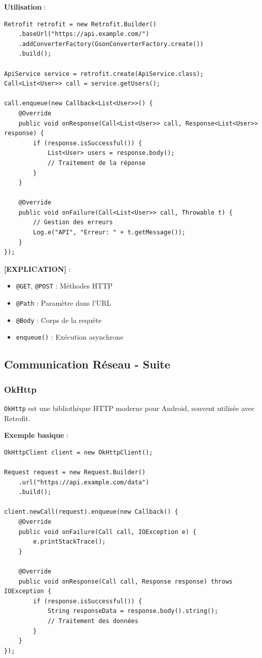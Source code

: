 \documentclass[11pt,a4paper]{article}
\begin{document}
\textbf{Utilisation} :
\begin{lstlisting}
Retrofit retrofit = new Retrofit.Builder()
    .baseUrl("https://api.example.com/")
    .addConverterFactory(GsonConverterFactory.create())
    .build();

ApiService service = retrofit.create(ApiService.class);
Call<List<User>> call = service.getUsers();

call.enqueue(new Callback<List<User>>() {
    @Override
    public void onResponse(Call<List<User>> call, Response<List<User>> response) {
        if (response.isSuccessful()) {
            List<User> users = response.body();
            // Traitement de la réponse
        }
    }
    
    @Override
    public void onFailure(Call<List<User>> call, Throwable t) {
        // Gestion des erreurs
        Log.e("API", "Erreur: " + t.getMessage());
    }
});
\end{lstlisting}

\textbf{[EXPLICATION]} :
\begin{itemize}
    \item \texttt{@GET}, \texttt{@POST} : Méthodes HTTP
    \item \texttt{@Path} : Paramètre dans l'URL
    \item \texttt{@Body} : Corps de la requête
    \item \texttt{enqueue()} : Exécution asynchrone
\end{itemize}

\subsection{Communication Réseau - Suite}

\subsubsection{OkHttp}

\texttt{OkHttp} est une bibliothèque HTTP moderne pour Android, souvent utilisée avec Retrofit.

\textbf{Exemple basique} :
\begin{lstlisting}
OkHttpClient client = new OkHttpClient();

Request request = new Request.Builder()
    .url("https://api.example.com/data")
    .build();

client.newCall(request).enqueue(new Callback() {
    @Override
    public void onFailure(Call call, IOException e) {
        e.printStackTrace();
    }
    
    @Override
    public void onResponse(Call call, Response response) throws IOException {
        if (response.isSuccessful()) {
            String responseData = response.body().string();
            // Traitement des données
        }
    }
});
\end{lstlisting}
\end{document}

